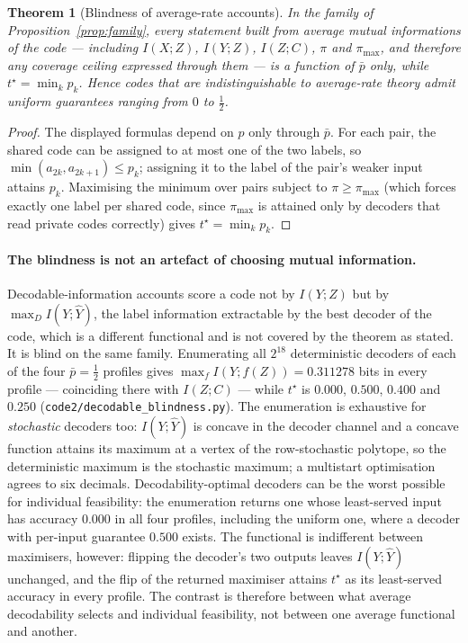 \documentclass[11pt]{article}
\newtheorem{theorem}{Theorem}
\begin{document}
\begin{theorem}[Blindness of average-rate accounts]\label{thm:blind}
In the family of Proposition~\ref{prop:family}, every statement built from average mutual
informations of the code --- including $I(X;Z)$, $I(Y;Z)$, $I(Z;C)$, $\pi$ and $\pi_{\max}$, and
therefore any coverage ceiling expressed through them --- is a function of $\bar p$ only, while
$t^\star=\min_k p_k$. Hence codes that are indistinguishable to average-rate theory admit
uniform guarantees ranging from $0$ to $\tfrac12$.
\end{theorem}
\begin{proof}
The displayed formulas depend on $p$ only through $\bar p$. For each pair, the shared code can be
assigned to at most one of the two labels, so $\min(a_{2k},a_{2k+1})\le p_k$; assigning it to the
label of the pair's weaker input attains $p_k$. Maximising the minimum over pairs subject to
$\pi\ge\pi_{\max}$ (which forces exactly one label per shared code, since $\pi_{\max}$ is
attained only by decoders that read private codes correctly) gives $t^\star=\min_k p_k$.
\end{proof}

\paragraph{The blindness is not an artefact of choosing mutual information.}
Decodable-information accounts \citep{dubois2020} score a code not by $I(Y;Z)$ but by
$\max_{D}I(Y;\hat Y)$, the label information extractable by the best decoder of the code, which is a
different functional and is not covered by the theorem as stated. It is blind on the same family.
Enumerating all $2^{18}$ deterministic decoders of each of the four $\bar p=\tfrac12$ profiles gives
$\max_f I(Y;f(Z))=0.311278$ bits in every profile --- coinciding there with $I(Z;C)$ --- while
$t^\star$ is $0.000$, $0.500$, $0.400$ and $0.250$ (\texttt{code2/decodable\_blindness.py}). The
enumeration is exhaustive for \emph{stochastic} decoders too: $I(Y;\hat Y)$ is concave in the
decoder channel and a concave function attains its maximum at a vertex of the row-stochastic
polytope, so the deterministic maximum is the stochastic maximum; a multistart optimisation agrees
to six decimals.
Decodability-optimal decoders can be the worst possible for individual feasibility: the
enumeration returns one whose least-served input has accuracy $0.000$ in all four profiles,
including the uniform one, where a decoder with per-input guarantee $0.500$ exists. The functional
is indifferent between maximisers, however: flipping the decoder's two outputs leaves
$I(Y;\hat Y)$ unchanged, and the flip of the returned maximiser attains $t^\star$ as its
least-served accuracy in every profile. The contrast is therefore between what average
decodability selects and individual feasibility, not between one average functional and another.
\end{document}
